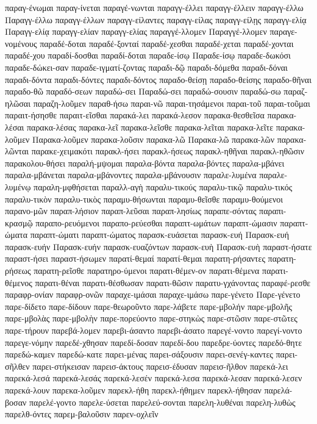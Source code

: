 {παραγ-ένωμαι
παραγ-ίνεται
παραγέ-νωνται
παραγγ-έλλει
παραγγ-έλλειν
παραγγ-έλλω
Παραγγ-έλλω
παραγγ-έλλων
παραγγ-είλαντες
παραγγ-είλας
παραγγ-είλῃς
παραγγ-ελίᾳ
Παραγγ-ελίᾳ
παραγγ-ελίαν
παραγγ-ελίας
παραγγέ-λλομεν
Παραγγέ-λλομεν
παραγε-νομένους
παραδέ-δοται
παραδέ-ξονταί
παραδέ-χεσθαι
παραδέ-χεται
παραδέ-χονται
παραδέ-χου
παραδί-δοσθαι
παραδί-δοται
παραδε-ίσῳ
Παραδε-ίσῳ
παραδε-δωκόσι
παραδε-δώκει-σαν
παραδε-ιγματί-ζοντας
παραδι-δῷ
παραδι-δόμεθα
παραδι-δόναι
παραδι-δόντα
παραδι-δόντες
παραδι-δόντος
παραδο-θείσῃ
παραδο-θείσης
παραδο-θῆναι
παραδο-θῶ
παραδό-σεων
παραδώ-σει
Παραδώ-σει
παραδώ-σουσιν
παραδώ-σω
παραζ-ηλῶσαι
παραζη-λοῦμεν
παραθ-ήσω
παραι-νῶ
παραι-τησάμενοι
παραι-τοῦ
παραι-τοῦμαι
παραιτ-ήσησθε
παραιτ-εῖσθαι
παρακά-λει
παρακά-λεσον
παρακα-θεσθεῖσα
παρακα-λέσαι
παρακα-λέσας
παρακα-λεῖ
παρακα-λεῖσθε
παρακα-λεῖται
παρακα-λεῖτε
παρακα-λοῦμεν
Παρακα-λοῦμεν
παρακα-λοῦσιν
παρακα-λῶ
Παρακα-λῶ
παρακα-λῶν
παρακα-λῶνται
παρακε-χειμακότι
παρακλ-ήσει
παρακλ-ήσεως
παρακλ-ηθῆναι
παρακλ-ηθῶσιν
παρακολου-θήσει
παραλή-μψομαι
παραλα-βόντα
παραλα-βόντες
παραλα-μβάνει
παραλα-μβάνεται
παραλα-μβάνοντες
παραλα-μβάνουσιν
παραλε-λυμένα
παραλε-λυμένῳ
παραλη-μφθήσεται
παραλλ-αγὴ
παραλυ-τικούς
παραλυ-τικῷ
παραλυ-τικός
παραλυ-τικὸν
παραλυ-τικὸς
παραμυ-θήσωνται
παραμυ-θεῖσθε
παραμυ-θούμενοι
παρανο-μῶν
παραπ-λήσιον
παραπ-λεῦσαι
παραπ-λησίως
παραπε-σόντας
παραπι-κρασμῷ
παραπο-ρευόμενοι
παραπο-ρεύεσθαι
παραπτ-ωμάτων
παραπτ-ώμασιν
παραπτ-ώματα
παραπτ-ώματι
παραπτ-ώματος
παρασκ-ευάσεται
παρασκ-ευή
Παρασκ-ευή
παρασκ-ευήν
Παρασκ-ευήν
παρασκ-ευαζόντων
παρασκ-ευὴ
Παρασκ-ευὴ
παραστ-ήσατε
παραστ-ήσει
παραστ-ήσωμεν
παρατί-θεμαί
παρατί-θεμαι
παρατη-ρήσαντες
παρατη-ρήσεως
παρατη-ρεῖσθε
παρατηρο-ύμενοι
παρατι-θέμεν-ον
παρατι-θέμενα
παρατι-θέμενος
παρατι-θέναι
παρατι-θέσθωσαν
παρατι-θῶσιν
παρατυ-γχάνοντας
παραφέ-ρεσθε
παραφρ-ονίαν
παραφρ-ονῶν
παραχε-ιμάσαι
παραχε-ιμάσω
παρε-γένετο
Παρε-γένετο
παρε-δίδετο
παρε-δίδουν
παρε-θεωροῦντο
παρε-λάβετε
παρε-μβολήν
παρε-μβολῆς
παρε-μβολὰς
παρε-μβολὴν
παρε-πορεύοντο
παρε-στηκὼς
παρε-στῶσιν
παρε-στῶτες
παρε-τήρουν
παρεβά-λομεν
παρεβι-άσαντο
παρεβι-άσατο
παρεγέ-νοντο
παρεγί-νοντο
παρεγε-νόμην
παρεδέ-χθησαν
παρεδί-δοσαν
παρεδί-δου
παρεδρε-ύοντες
παρεδό-θητε
παρεδώ-καμεν
παρεδώ-κατε
παρει-μένας
παρει-σάξουσιν
παρει-σενέγ-καντες
παρει-σῆλθεν
παρει-στήκεισαν
παρεισ-άκτους
παρεισ-έδυσαν
παρεισ-ῆλθον
παρεκά-λει
παρεκά-λεσά
παρεκά-λεσάς
παρεκά-λεσέν
παρεκά-λεσα
παρεκά-λεσαν
παρεκά-λεσεν
παρεκά-λουν
παρεκα-λοῦμεν
παρεκλ-ήθη
παρεκλ-ήθημεν
παρεκλ-ήθησαν
παρελά-βοσαν
παρελέ-γοντο
παρελε-ύσεται
παρελεύ-σονται
παρελη-λυθέναι
παρελη-λυθὼς
παρελθ-όντες
παρεμ-βαλοῦσιν
παρεν-οχλεῖν
}
